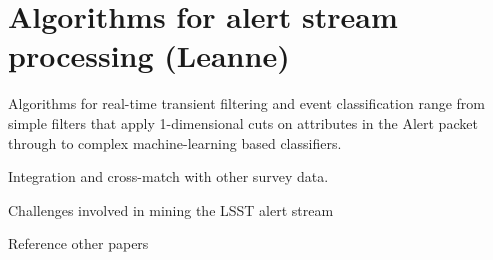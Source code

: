 \section{Algorithms for alert stream processing (Leanne)} \label{sec:algorithms}
Algorithms for real-time transient filtering and event classification range from simple filters that apply 1-dimensional cuts on attributes in the Alert packet through to complex machine-learning based classifiers. 



Integration and cross-match with other survey data.

Challenges involved in mining the LSST alert stream

Reference other papers 


